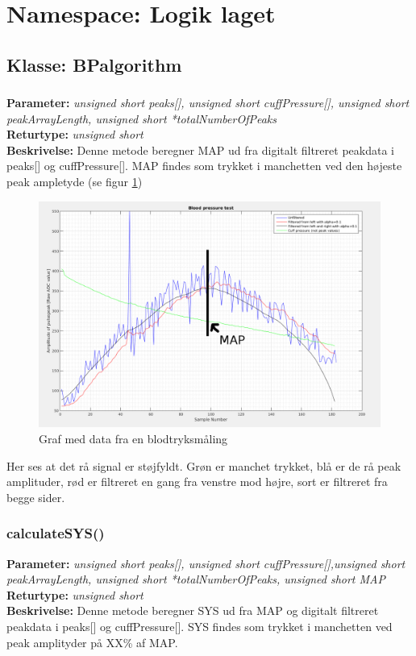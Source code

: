 \section{Namespace: Logik laget}

\subsection{Klasse: BPalgorithm}

\subsubsection{}
\textbf{Parameter: } \textit{unsigned short peaks[], unsigned short cuffPressure[], unsigned short peakArrayLength, unsigned short *totalNumberOfPeaks}
\\ \textbf{Returtype: } \textit{unsigned short}
\\ \textbf{Beskrivelse: } Denne metode beregner MAP ud fra digitalt filtreret peakdata i peaks[] og cuffPressure[]. MAP findes som trykket i manchetten ved den højeste peak ampletyde (se figur \ref{fig:bpMeasurement})
\begin{figure}[H]
	\includegraphics[width=\textwidth]{billeder/4_11_2016.png}
	\caption{Graf med data fra en blodtryksmåling}\label{fig:bpMeasurement}
\end{figure}
Her ses at det rå signal er støjfyldt. Grøn er manchet trykket, blå er de rå peak amplituder, rød er filtreret en gang fra venstre mod højre, sort	er filtreret fra begge sider.

\subsubsection{calculateSYS()}
\textbf{Parameter: } \textit{unsigned short peaks[], unsigned short cuffPressure[],unsigned short peakArrayLength, unsigned short *totalNumberOfPeaks, unsigned short MAP}
\\ \textbf{Returtype: } \textit{unsigned short}
\\ \textbf{Beskrivelse: } Denne metode beregner SYS ud fra MAP og digitalt filtreret peakdata i peaks[] og cuffPressure[]. SYS findes som trykket i manchetten ved peak amplityder på XX\% af MAP.

